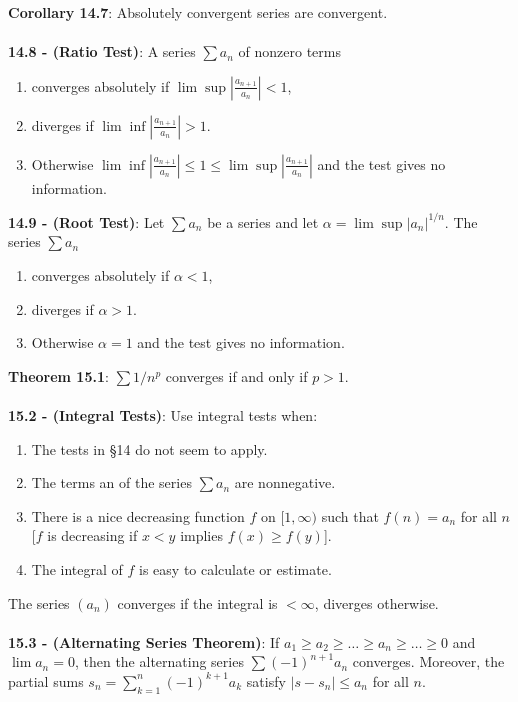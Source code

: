 \documentclass{article}
\theoremstyle{definition}
\DeclareMathOperator{\Inf}{inf}
\DeclareMathOperator{\Sup}{sup}
\begin{document}
\textbf{Corollary 14.7}: Absolutely convergent series are convergent. \\ \\
\textbf{14.8 - (Ratio Test)}: A series $\sum a_n$ of nonzero terms \begin{enumerate}
    \item converges absolutely if $\lim \Sup |\frac{a_{n+1}}{a_n}| < 1$,
    \item diverges if $\lim \Inf |\frac{a_{n+1}}{a_n}| > 1$.
    \item Otherwise $\lim \Inf |\frac{a_{n+1}}{a_n}| \leq 1 \leq \lim \Sup |\frac{a_{n+1}}{a_n}|$ and the test gives no information.
\end{enumerate} $ $ \\
\textbf{14.9 - (Root Test)}: Let $\sum a_n$ be a series and let $\alpha = \lim \Sup |a_n|^{1/n}$. The series $\sum a_n$ \begin{enumerate}
    \item converges absolutely if $\alpha < 1$,
    \item diverges if $\alpha > 1$.
    \item Otherwise $\alpha = 1$ and the test gives no information.
\end{enumerate} $ $ \\
\textbf{Theorem 15.1}: $\sum 1/n^p$ converges if and only if $p > 1$. \\ \\
\textbf{15.2 - (Integral Tests)}: Use integral tests when: \begin{enumerate}
    \item The tests in §14 do not seem to apply.
    \item The terms an of the series $\sum a_n$ are nonnegative.
    \item There is a nice decreasing function $f$ on $[1, \infty)$ such that $f(n) = a_n$ for all $n$ [$f$ is decreasing if $x < y$ implies $f(x) \geq f(y)$].
    \item The integral of $f$ is easy to calculate or estimate.
\end{enumerate} The series $(a_n)$ converges if the integral is $< \infty$, diverges otherwise. \\ \\
\textbf{15.3 - (Alternating Series Theorem)}: If $a_1 \geq a_2 \geq \dots \geq a_n \geq \dots \geq 0$ and $\lim a_n = 0$, then the alternating series $\sum (-1)^{n + 1}a_n$ converges. Moreover, the partial sums $s_n = \sum_{k = 1}^n (-1)^{k + 1}a_k$ satisfy $|s - s_n| \leq a_n$ for all $n$.
\end{document}
